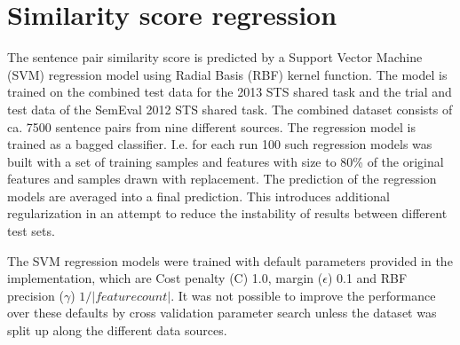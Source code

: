 
\section{Similarity score regression}
\label{sec:regression}

The sentence pair similarity score is predicted by a Support Vector Machine (SVM) regression model using Radial Basis (RBF) kernel function. The model is trained on the combined test data for the 2013 STS shared task and the trial and test data of the SemEval 2012 STS shared task. The combined dataset consists of ca. 7500 sentence pairs from nine different sources. The regression model is trained as a bagged classifier. I.e. for each run 100 such regression models was built with a set of training samples and features with size to 80\% of the original features and samples drawn with replacement. The prediction of the regression models are averaged into a final prediction. This introduces additional regularization in an attempt to reduce the instability of results between different test sets.

The SVM regression models were trained with default parameters provided in the implementation, which are Cost penalty (C) 1.0, margin ($\epsilon$) 0.1 and RBF precision ($\gamma$) $1/|feature count|$. It was not possible to improve the performance over these defaults by cross validation parameter search unless the dataset was split up along the different data sources.
